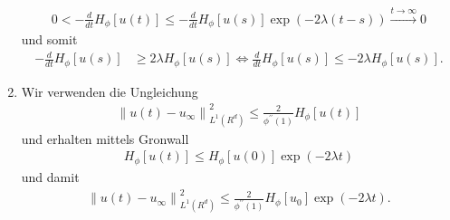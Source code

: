 \begin{solution}
\begin{enumerate}[label = (\roman*)]
\begin{align*}
    0 < -\frac{d}{d t} H_{\phi}[u(t)] \leq -\frac{d}{d t} H_{\phi}[u(s)]\exp(-2\lambda (t-s))
    \xrightarrow{t \to \infty} 0
  \end{align*}
  und somit
  \begin{align*}
  -\frac{d}{d t} H_{\phi}[u(s)]
  &\geq 2\lambda H_{\phi}[u(s)] \iff \frac{d}{d t} H_{\phi}[u(s)] \leq -2\lambda H_{\phi}[u(s)].
  \end{align*}
  \item Wir verwenden die Ungleichung
  \begin{align*}
  \left\|u(t)-u_{\infty}\right\|_{L^{1}\left(R^{d}\right)}^2
  \leq \frac{2}{\phi^{\prime \prime}(1)} H_{\phi}[u(t)]
  \end{align*}
  und erhalten mittels Gronwall
  \begin{align*}
    H_{\phi}[u(t)] \leq H_{\phi}[u(0)]\exp(-2\lambda t)
  \end{align*}
  und damit
  \begin{align*}
  \left\|u(t)-u_{\infty}\right\|_{L^{1}\left(R^{d}\right)}^2
  \leq \frac{2}{\phi^{\prime \prime}(1)} H_{\phi}[u_0]\exp(-2\lambda t).
  \end{align*}
\end{enumerate}

\end{solution}

